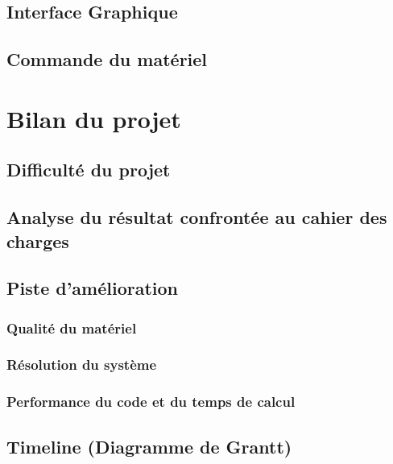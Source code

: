 \documentclass[a4paper]{report}
\begin{document}
        \section{Interface Graphique}
        \section{Commande du matériel}

    \chapter{Bilan du projet}

        \section{Difficulté du projet}
        \section{Analyse du résultat confrontée au cahier des charges}
        \section{Piste d'amélioration}
            \subsection{Qualité du matériel}
            \subsection{Résolution du système}
            \subsection{Performance du code et du temps de calcul}
        \section{Timeline (Diagramme de Grantt)}
    
    
    
\end{document}
